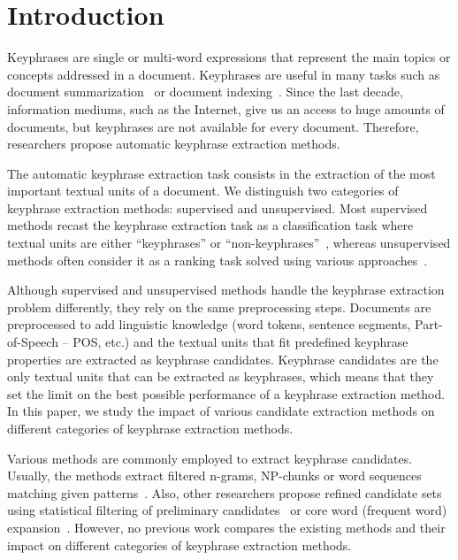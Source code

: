 \section{Introduction}
\label{sec:section}
  Keyphrases are single or multi-word expressions that represent the main topics
  or concepts addressed in a document. Keyphrases are useful in many tasks such
  as document summarization~\cite{avanzo2005keyphrase} or document
  indexing~\cite{medelyan2008smalltrainingset}. Since the last decade,
  information mediums, such as the Internet, give us an access to huge amounts
  of documents, but keyphrases are not available for every document. Therefore,
  researchers propose automatic keyphrase extraction methods.

  The automatic keyphrase extraction task consists in the extraction of the
  most important textual units of a document. We distinguish two categories of
  keyphrase extraction methods: supervised and unsupervised. Most supervised
  methods recast the keyphrase extraction task as a classification task where
  textual units are either ``keyphrases'' or
  ``non-keyphrases''~\cite{witten1999kea}, whereas unsupervised methods often
  consider it as a ranking task solved using various
  approaches~\cite{hassan2010conundrums}.

  Although supervised and unsupervised methods handle the keyphrase extraction
  problem differently, they rely on the same preprocessing steps. Documents are
  preprocessed to add linguistic knowledge (word tokens, sentence segments,
  Part-of-Speech -- POS, etc.) and the textual units that fit predefined
  keyphrase properties are extracted as keyphrase candidates. Keyphrase
  candidates are the only textual units that can be extracted as keyphrases,
  which means that they set the limit on the best possible performance of a
  keyphrase extraction method. In this paper, we study the impact of various
  candidate extraction methods on different categories of keyphrase extraction
  methods.

  Various methods are commonly employed to extract keyphrase candidates.
  Usually, the methods extract filtered n-grams, NP-chunks or word sequences
  matching given patterns~\cite{hulth2003keywordextraction}. Also, other
  researchers propose refined candidate sets using statistical filtering of
  preliminary candidates~\cite{kim2009reexaminingautomatickeyphraseextraction}
  or core word (frequent word) expansion~\cite{you2009refinedcandidateset}.
  However, no previous work compares the existing methods and their impact on
  different categories of keyphrase extraction methods. 

